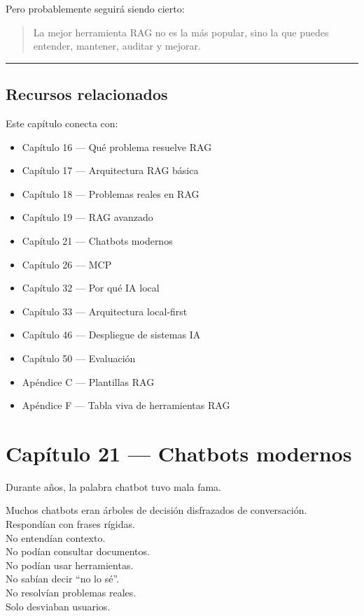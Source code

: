 Pero probablemente seguirá siendo cierto:

\begin{quote}
La mejor herramienta RAG no es la más popular, sino la que puedes
entender, mantener, auditar y mejorar.
\end{quote}

\begin{center}\rule{0.5\linewidth}{0.5pt}\end{center}

\section{Recursos relacionados}\label{recursos-relacionados-19}

Este capítulo conecta con:

\begin{itemize}
\tightlist
\item
  Capítulo 16 --- Qué problema resuelve RAG
\item
  Capítulo 17 --- Arquitectura RAG básica
\item
  Capítulo 18 --- Problemas reales en RAG
\item
  Capítulo 19 --- RAG avanzado
\item
  Capítulo 21 --- Chatbots modernos
\item
  Capítulo 26 --- MCP
\item
  Capítulo 32 --- Por qué IA local
\item
  Capítulo 33 --- Arquitectura local-first
\item
  Capítulo 46 --- Despliegue de sistemas IA
\item
  Capítulo 50 --- Evaluación
\item
  Apéndice C --- Plantillas RAG
\item
  Apéndice F --- Tabla viva de herramientas RAG
\end{itemize}

\newpage

\chapter{Capítulo 21 --- Chatbots
modernos}\label{capuxedtulo-21-chatbots-modernos}

Durante años, la palabra chatbot tuvo mala fama.

Muchos chatbots eran árboles de decisión disfrazados de conversación.\\
Respondían con frases rígidas.\\
No entendían contexto.\\
No podían consultar documentos.\\
No podían usar herramientas.\\
No sabían decir ``no lo sé''.\\
No resolvían problemas reales.\\
Solo desviaban usuarios.

